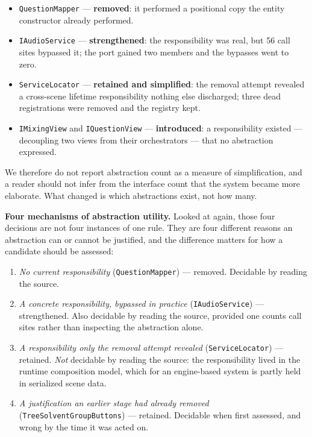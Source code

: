 \documentclass[pdflatex,sn-basic]{sn-jnl}
\begin{document}
\begin{itemize}\itemsep2pt
\item \texttt{QuestionMapper} --- \textbf{removed}: it performed a positional copy the entity constructor already performed.
\item \texttt{IAudioService} --- \textbf{strengthened}: the responsibility was real, but 56 call sites bypassed it; the port gained two members and the bypasses went to zero.
\item \texttt{ServiceLocator} --- \textbf{retained and simplified}: the removal attempt revealed a cross-scene lifetime responsibility nothing else discharged; three dead registrations were removed and the registry kept.
\item \texttt{IMixingView} and \texttt{IQuestionView} --- \textbf{introduced}: a responsibility existed --- decoupling two views from their orchestrators --- that no abstraction expressed.
\end{itemize}

We therefore do not report abstraction count as a measure of simplification, and a reader should not infer from the interface count that the system became more elaborate. What changed is which abstractions exist, not how many.

\medskip\noindent\textbf{Four mechanisms of abstraction utility.} Looked at again, those four decisions are not four instances of one rule. They are four different reasons an abstraction can or cannot be justified, and the difference matters for how a candidate should be assessed:

\begin{enumerate}\itemsep2pt
\item \emph{No current responsibility} (\texttt{QuestionMapper}) --- removed. Decidable by reading the source.
\item \emph{A concrete responsibility, bypassed in practice} (\texttt{IAudioService}) --- strengthened. Also decidable by reading the source, provided one counts call sites rather than inspecting the abstraction alone.
\item \emph{A responsibility only the removal attempt revealed} (\texttt{ServiceLocator}) --- retained. \emph{Not} decidable by reading the source: the responsibility lived in the runtime composition model, which for an engine-based system is partly held in serialized scene data.
\item \emph{A justification an earlier stage had already removed} (\texttt{TreeSolventGroupButtons}) --- retained. Decidable when first assessed, and wrong by the time it was acted on.
\end{enumerate}
\end{document}
